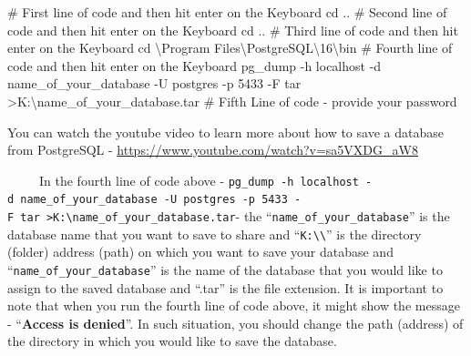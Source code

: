 \documentclass[
  letterpaper,
  DIV=11,
  numbers=noendperiod]{scrreprt}
\newenvironment{Shaded}{\begin{snugshade}}{\end{snugshade}}
\newcommand{\CommentTok}[1]{\textcolor[rgb]{0.37,0.37,0.37}{#1}}
\newcommand{\DecValTok}[1]{\textcolor[rgb]{0.68,0.00,0.00}{#1}}
\newcommand{\NormalTok}[1]{\textcolor[rgb]{0.00,0.23,0.31}{#1}}
\newcommand{\SpecialCharTok}[1]{\textcolor[rgb]{0.37,0.37,0.37}{#1}}
\begin{document}
\begin{Shaded}
\begin{Highlighting}[]
\CommentTok{\# First line of code and then hit enter on the Keyboard}
\NormalTok{cd ..}
\CommentTok{\# Second line of code and then hit enter on the Keyboard}
\NormalTok{cd ..}
\CommentTok{\# Third line of code and then hit enter on the Keyboard}
\NormalTok{cd \textbackslash{}Program Files\textbackslash{}PostgreSQL\textbackslash{}}\DecValTok{16}\NormalTok{\textbackslash{}bin}
\CommentTok{\# Fourth line of code and then hit enter on the Keyboard}
\NormalTok{pg\_dump }\SpecialCharTok{{-}}\NormalTok{h localhost }\SpecialCharTok{{-}}\NormalTok{d name\_of\_your\_database }\SpecialCharTok{{-}}\NormalTok{U postgres }\SpecialCharTok{{-}}\NormalTok{p }\DecValTok{5433} \SpecialCharTok{{-}}\NormalTok{F tar }\SpecialCharTok{\textgreater{}}\NormalTok{K}\SpecialCharTok{:}\NormalTok{\textbackslash{}name\_of\_your\_database.tar}
\CommentTok{\# Fifth Line of code {-} provide your password}
\end{Highlighting}
\end{Shaded}

\begin{tcolorbox}[enhanced jigsaw, arc=.35mm, bottomrule=.15mm, bottomtitle=1mm, breakable, colback=white, colbacktitle=quarto-callout-tip-color!10!white, colframe=quarto-callout-tip-color-frame, coltitle=black, left=2mm, leftrule=.75mm, opacityback=0, opacitybacktitle=0.6, rightrule=.15mm, title=\textcolor{quarto-callout-tip-color}{\faLightbulb}\hspace{0.5em}{Tip}, titlerule=0mm, toprule=.15mm, toptitle=1mm]

You can watch the youtube video to learn more about how to save a
database from PostgreSQL -
\url{https://www.youtube.com/watch?v=sa5VXDG_aW8}

\end{tcolorbox}

~~~~~In the fourth line of code above -
\texttt{pg\_dump\ -h\ localhost\ -d\ name\_of\_your\_database\ -U\ postgres\ -p\ 5433\ -F\ tar\ \textgreater{}K:\textbackslash{}name\_of\_your\_database.tar}-
the ``\texttt{name\_of\_your\_database}'' is the database name that you
want to save to share and
``\texttt{K:\textbackslash{}\textbackslash{}}'' is the directory
(folder) address (path) on which you want to save your database and
``\texttt{name\_of\_your\_database}'' is the name of the database that
you would like to assign to the saved database and ``.tar'' is the file
extension. It is important to note that when you run the fourth line of
code above, it might show the message - ``\textbf{Access is denied}''.
In such situation, you should change the path (address) of the directory
in which you would like to save the database.
\end{document}

